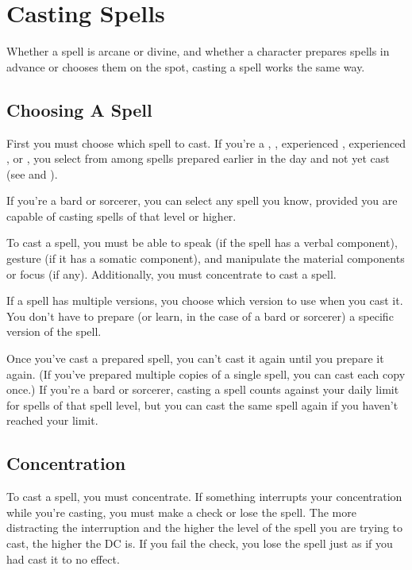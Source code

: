 \section{Casting Spells}

Whether a spell is arcane or divine, and whether a character prepares spells in 
advance or chooses them on the spot, casting a spell works the same way.

\subsection{Choosing A Spell}

First you must choose which spell to cast. If you're a , , experienced 
, experienced , or , you select from among spells prepared earlier 
in the day and not yet cast (see  and ).

If you're a bard or sorcerer, you can select any spell you know, provided you are 
capable of casting spells of that level or higher.

To cast a spell, you must be able to speak (if the spell has a verbal component), 
gesture (if it has a somatic component), and manipulate the material components 
or focus (if any). Additionally, you must concentrate to cast a spell.

If a spell has multiple versions, you choose which version to use when you cast 
it. You don't have to prepare (or learn, in the case of a bard or sorcerer) a specific 
version of the spell.

Once you've cast a prepared spell, you can't cast it again until you prepare it 
again. (If you've prepared multiple copies of a single spell, you can cast each 
copy once.) If you're a bard or sorcerer, casting a spell counts against your daily 
limit for spells of that spell level, but you can cast the same spell again if 
you haven't reached your limit.

\subsection{Concentration}

To cast a spell, you must concentrate. If something interrupts your concentration 
while you're casting, you must make a  check or lose the spell. The 
more distracting the interruption and the higher the level of the spell you are 
trying to cast, the higher the DC is. If you fail the check, you lose the spell 
just as if you had cast it to no effect.

